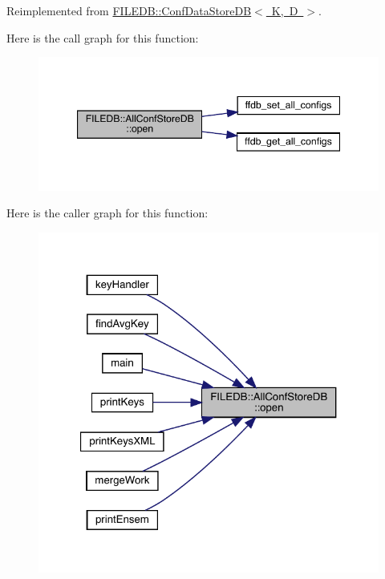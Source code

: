 Reimplemented from \mbox{\hyperlink{classFILEDB_1_1ConfDataStoreDB_ab87e2fb12067bfb19c1f381a433fd442}{F\+I\+L\+E\+D\+B\+::\+Conf\+Data\+Store\+D\+B$<$ K, D $>$}}.

Here is the call graph for this function\+:
\nopagebreak
\begin{figure}[H]
\begin{center}
\leavevmode
\includegraphics[width=347pt]{df/db6/classFILEDB_1_1AllConfStoreDB_aa6e6deb3c33076d16db4ac0560f0d75f_cgraph}
\end{center}
\end{figure}
Here is the caller graph for this function\+:\nopagebreak
\begin{figure}[H]
\begin{center}
\leavevmode
\includegraphics[width=321pt]{df/db6/classFILEDB_1_1AllConfStoreDB_aa6e6deb3c33076d16db4ac0560f0d75f_icgraph}
\end{center}
\end{figure}
\mbox{\label{classFILEDB_1_1AllConfStoreDB_aa6e6deb3c33076d16db4ac0560f0d75f}} 
